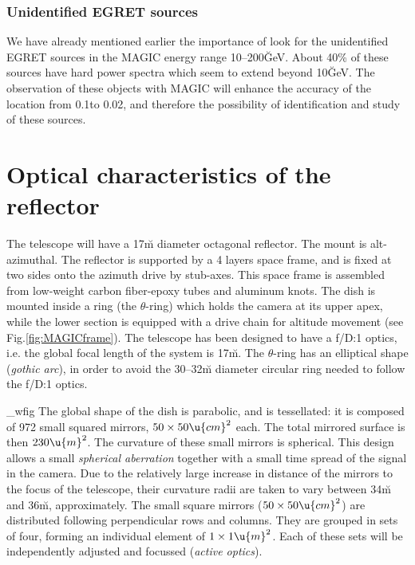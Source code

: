 \subsubsection*{Unidentified EGRET sources} 
%
We have  already   mentioned earlier the  importance of   look for the
unidentified EGRET  sources in the  MAGIC energy range 10--200\u{GeV}. 
About 40\% of  these  sources have hard power   spectra which seem  to
extend  beyond 10\u{GeV}. The observation  of these objects with MAGIC
will enhance the  accuracy of the  location from 0.1\deg to  0.02\deg,
and  therefore  the possibility of  identification  and study of these
sources.

\MAGICframefig

\section{Optical characteristics of the reflector}
%
The \MAGIC telescope will have a 17\u{m} diameter octagonal reflector.
The mount  is alt-azimuthal. The reflector  is supported by a 4 layers
space  frame, and  is  fixed at two   sides onto the  azimuth drive by
stub-axes. This space   frame  is  assembled from   low-weight  carbon
fiber-epoxy tubes  and aluminum  knots. The dish  is  mounted inside a
ring (the  $\theta$-ring) which holds the   camera at its  upper apex,
while the lower  section is equipped with a  drive chain for  altitude
movement  (see   Fig.\ref{fig:MAGICframe}).  The  telescope has   been
designed to have a f/D:1 optics,  i.e. the global  focal length of the
system   is  17\u{m}.  The $\theta$-ring     has  an elliptical  shape
(\emph{gothic arc}), in   order  to  avoid  the  30--32\u{m}  diameter
circular ring needed to follow the f/D:1 optics.

\MAGICmirrorcontrol_wfig
%
The global shape  of the dish is parabolic,  and is tessellated: it is
composed of 972  small squared mirrors,  $50\times 50 \u{cm}^2$ each.  
The   total mirrored surface is    then $230\u{m}^2$. The curvature of
these small    mirrors  is spherical.  This    design  allows a  small
\emph{spherical  aberration} together with a small  time spread of the
signal in the camera. Due to the relatively large increase in distance
of the mirrors  to the focus of  the telescope, their curvature  radii
are taken   to vary between 34\u{m}  and  36\u{m}, approximately.  The
small  square   mirrors  ($50\times 50   \u{cm}^2$)   are  distributed
following perpendicular rows and columns. They  are grouped in sets of
four,  forming an individual element of  $1\times 1 \u{m}^2$.  Each of
these sets will  be independently adjusted and focussed  (\emph{active
  optics}).

